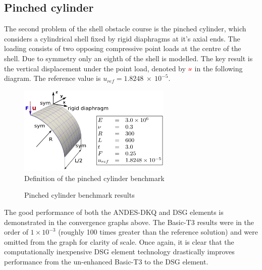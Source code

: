\subsection{Pinched cylinder}
%

The second problem of the shell obstacle course is the pinched cylinder, which considers a cylindrical shell fixed by rigid diaphragms at it's axial ends. The loading consists of two opposing compressive point loads at the centre of the shell. Due to symmetry only an eighth of the shell is modelled. The key result is the vertical displacement under the point load, denoted by $\textcolor{red}{u}$ in the following diagram. The reference value is $u_{ref} =  1.8248\ \times\ 10^{-5}$. 
 
 \begin{figure}[H]
 	\centering
 	\def\svgwidth{\columnwidth}
 	\includegraphics[width=7.3cm]{images/pinchedcylinder.png}
 	\caption{Definition of the pinched cylinder benchmark\cite{Bou13}}
 \end{figure}
 
\begin{figure}[H]
	\caption{\label{ref_label_overall}Pinched cylinder benchmark results}
\end{figure}

 The good performance of both the ANDES-DKQ and DSG elements is demonstrated in the convergence graphs above. The Basic-T3 results were in the order of $1\times10^{-3}$ (roughly 100 times greater than the reference solution) and were omitted from the graph for clarity of scale. Once again, it is clear that the computationally inexpensive DSG element technology drastically improves performance from the un-enhanced Basic-T3 to the DSG element.
\newpage
